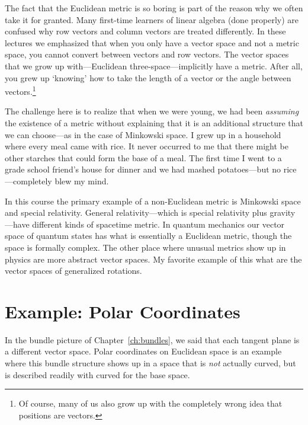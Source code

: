 \documentclass[12pt, oneside]{report}    %
\let\oldsection\section
\def\section{%
  \setcounter{sidenote}{1}%
  \oldsection
}
\begin{document}
\begin{example}
The fact that the Euclidean metric is so boring is part of the reason why we often take it for granted. Many first-time learners of linear algebra (done properly) are confused why row vectors and column vectors are treated differently. In these lectures we emphasized that when you only have a vector space and not a metric space, you cannot convert between vectors and row vectors. The vector spaces that we grow up with---Euclidean three-space---implicitly have a metric. After all, you grew up `knowing' how to take the length of a vector or the angle between vectors.\footnote{Of course, many of us also grow up with the completely wrong idea that positions are vectors.} 

The challenge here is to realize that when we were young, we had been \emph{assuming} the existence of a metric without explaining that it is an additional structure that we can choose---as in the case of Minkowski space. I grew up in a household where every meal came with rice. It never occurred to me that there might be other starches that could form the base of a meal. The first time I went to a grade school friend's house for dinner and we had mashed potatoes---but no rice---completely blew my mind. 
\end{example}

In this course the primary example of a non-Euclidean metric is Minkowski space and special relativity. General relativity---which is special relativity plus gravity---have different kinds of spacetime metric. In quantum mechanics our vector space of quantum states has what is essentially a Euclidean metric, though the space is formally complex. The other place where unusual metrics show up in physics are more abstract vector spaces. My favorite example of this what are the vector spaces of generalized rotations.


\section{Example: Polar Coordinates}

In the bundle picture of Chapter~\ref{ch:bundles}, we said that each tangent plane is a different vector space. Polar coordinates on Euclidean space is an example where this bundle structure shows up in a space that is \emph{not} actually curved, but is described readily with curved for the base space. 
\end{document}
